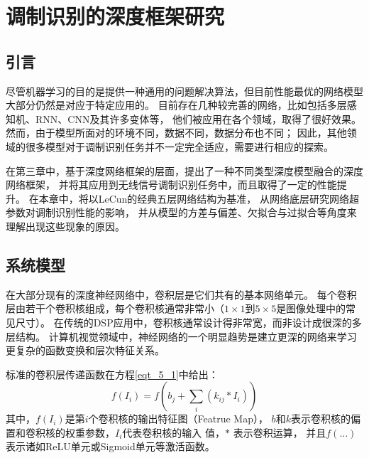 \chapter{调制识别的深度框架研究}

\section{引言}

尽管机器学习的目的是提供一种通用的问题解决算法，但目前性能最优的网络模型大部分仍然是对应于特定应用的。
目前存在几种较完善的网络，比如包括多层感知机、RNN、CNN及其许多变体等，
他们被应用在各个领域，取得了很好效果\cite{lecun2015deep, schmidhuber2015deep}。
然而，由于模型所面对的环境不同，数据不同，数据分布也不同；
因此，其他领域的很多模型对于调制识别任务并不一定完全适应，需要进行相应的探索。 \par

在第三章中，基于深度网络框架的层面，提出了一种不同类型深度模型融合的深度网络框架，
并将其应用到无线信号调制识别任务中，而且取得了一定的性能提升。
在本章中，将以LeCun的经典五层网络结构\cite{lecun1998gradient}为基准，
从网络底层研究网络超参数对调制识别性能的影响，
并从模型的方差与偏差\cite{周志华2016机器学习}、欠拟合与过拟合\cite{goodfellow2016deep}等角度来理解出现这些现象的原因。\par

\section{系统模型}

在大部分现有的深度神经网络中，卷积层是它们共有的基本网络单元。
每个卷积层由若干个卷积核组成，每个卷积核通常非常小（$1 \times 1$到$5 \times 5$是图像处理中的常见尺寸）。
在传统的DSP应用中，卷积核通常设计得非常宽，而非设计成很深的多层结构。
计算机视觉领域中，神经网络的一个明显趋势是建立更深的网络来学习更复杂的函数变换和层次特征关系。\par

标准的卷积层传递函数在方程\eqref{eqt_5_1}中给出：
\begin{equation}
	\label{eqt_5_1}
	f(I_i) = f (b_j + \sum_{i}(k_{ij} * I_i))
\end{equation}
其中，$f(I_i)$是第$i$个卷积核的输出特征图（Featrue Map），
$b$和$k$表示卷积核的偏置和卷积核的权重参数，$I_i$代表卷积核的输入 值，$*$ 表示卷积运算，
并且$f(\dots)$表示诸如ReLU单元或Sigmoid单元等激活函数。\par

